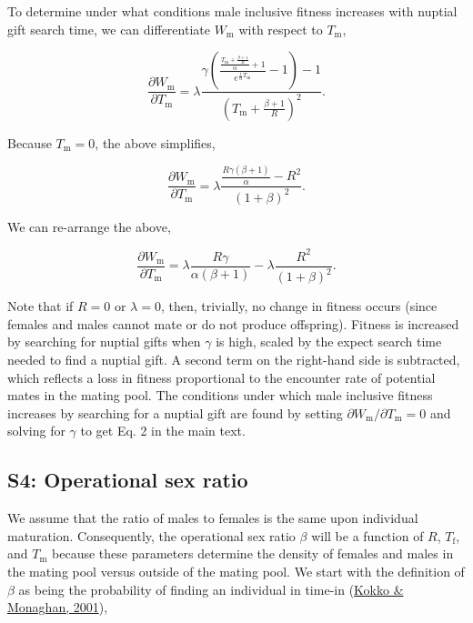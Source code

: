 \documentclass[
]{article}
\begin{document}
To determine under what conditions male inclusive fitness increases with
nuptial gift search time, we can differentiate \(W_{\mathrm{m}}\) with
respect to \(T_{\mathrm{m}}\),

\[\frac{\partial W_{\mathrm{m}}}{\partial T_{\mathrm{m}}} = \lambda\frac{\gamma\left(\frac{\frac{T_{\mathrm{m}} + \frac{\beta + 1}{R}}{\alpha} + 1}{e^{\frac{1}{\alpha}T_{\mathrm{m}}}} - 1\right) - 1}{\left(T_{\mathrm{m}} + \frac{\beta + 1}{R} \right)^{2}}.\]

Because \(T_{\mathrm{m}} = 0\), the above simplifies,

\[\frac{\partial W_{\mathrm{m}}}{\partial T_{\mathrm{m}}} = \lambda \frac{\frac{R\gamma\left(\beta + 1\right)}{\alpha} - R^{2}}{\left(1 + \beta \right)^{2}}.\]

We can re-arrange the above,

\[\frac{\partial W_{\mathrm{m}}}{\partial T_{\mathrm{m}}} = \lambda \frac{R\gamma}{\alpha\left(\beta+1\right)} - \lambda\frac{R^{2}}{{\left(1 + \beta \right)^{2}}}.\]

Note that if \(R = 0\) or \(\lambda = 0\), then, trivially, no change in
fitness occurs (since females and males cannot mate or do not produce
offspring). Fitness is increased by searching for nuptial gifts when
\(\gamma\) is high, scaled by the expect search time needed to find a
nuptial gift. A second term on the right-hand side is subtracted, which
reflects a loss in fitness proportional to the encounter rate of
potential mates in the mating pool. The conditions under which male
inclusive fitness increases by searching for a nuptial gift are found by
setting \(\partial W_{\mathrm{m}}/\partial T_{\mathrm{m}} = 0\) and
solving for \(\gamma\) to get Eq. 2 in the main text.

\clearpage

\hypertarget{s4-operational-sex-ratio}{%
\subsection{S4: Operational sex ratio}\label{s4-operational-sex-ratio}}

We assume that the ratio of males to females is the same upon individual
maturation. Consequently, the operational sex ratio \(\beta\) will be a
function of \(R\), \(T_{\mathrm{f}}\), and \(T_{\mathrm{m}}\) because
these parameters determine the density of females and males in the
mating pool versus outside of the mating pool. We start with the
definition of \(\beta\) as being the probability of finding an
individual in time-in (\protect\hyperlink{ref-Kokko2001}{Kokko \&
Monaghan, 2001}),
\end{document}

